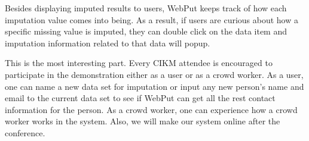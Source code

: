 \documentclass[sigconf]{acmart}
\begin{document}
 Besides displaying imputed results to users, WebPut keeps track of how each imputation value comes into being. As a result, if users are curious about how a specific missing value is imputed, they can double click on the data item and imputation information related to that data will popup. %

This is the most interesting part. Every CIKM attendee is encouraged to participate in the demonstration either as a user or as a crowd worker. As a user, one can name a new data set for imputation or input any new person's name and email to the current data set to see if WebPut can get all the rest contact information for the person. As a crowd worker, one can experience how a crowd worker works in the system.
%
Also, we will make our system online after the conference.



\end{document}
